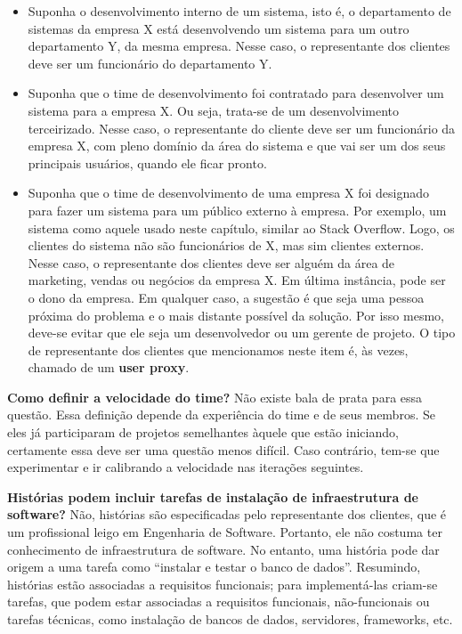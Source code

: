 \documentclass[
  11pt,
  twoside]{book}
\begin{document}
\begin{itemize}
\item
  Suponha o desenvolvimento interno de um sistema, isto é, o
  departamento de sistemas da empresa X está desenvolvendo um sistema
  para um outro departamento Y, da mesma empresa. Nesse caso, o
  representante dos clientes deve ser um funcionário do departamento Y.
\item
  Suponha que o time de desenvolvimento foi contratado para desenvolver
  um sistema para a empresa X. Ou seja, trata-se de um desenvolvimento
  terceirizado. Nesse caso, o representante do cliente deve ser um
  funcionário da empresa X, com pleno domínio da área do sistema e que
  vai ser um dos seus principais usuários, quando ele ficar pronto.
\item
  Suponha que o time de desenvolvimento de uma empresa X foi designado
  para fazer um sistema para um público externo à empresa. Por exemplo,
  um sistema como aquele usado neste capítulo, similar ao Stack
  Overflow. Logo, os clientes do sistema não são funcionários de X, mas
  sim clientes externos. Nesse caso, o representante dos clientes deve
  ser alguém da área de marketing, vendas ou negócios da empresa X. Em
  última instância, pode ser o dono da empresa. Em qualquer caso, a
  sugestão é que seja uma pessoa próxima do problema e o mais distante
  possível da solução. Por isso mesmo, deve-se evitar que ele seja um
  desenvolvedor ou um gerente de projeto. O tipo de representante dos
  clientes que mencionamos neste item é, às vezes, chamado de um
  \textbf{user proxy}.
\end{itemize}

  \textbf{Como
definir a velocidade do time?} Não existe bala de prata para essa
questão. Essa definição depende da experiência do time e de seus
membros. Se eles já participaram de projetos semelhantes àquele que
estão iniciando, certamente essa deve ser uma questão menos difícil.
Caso contrário, tem-se que experimentar e ir calibrando a velocidade nas
iterações seguintes.

\textbf{Histórias podem incluir tarefas de instalação de infraestrutura
de software?} Não, histórias são especificadas pelo representante dos
clientes, que é um profissional leigo em Engenharia de Software.
Portanto, ele não costuma ter conhecimento de infraestrutura de
software. No entanto, uma história pode dar origem a uma tarefa como
``instalar e testar o banco de dados''. Resumindo, histórias estão
associadas a requisitos funcionais; para implementá-las criam-se
tarefas, que podem estar associadas a requisitos funcionais,
não-funcionais ou tarefas técnicas, como instalação de bancos de dados,
servidores, frameworks, etc.
\end{document}
